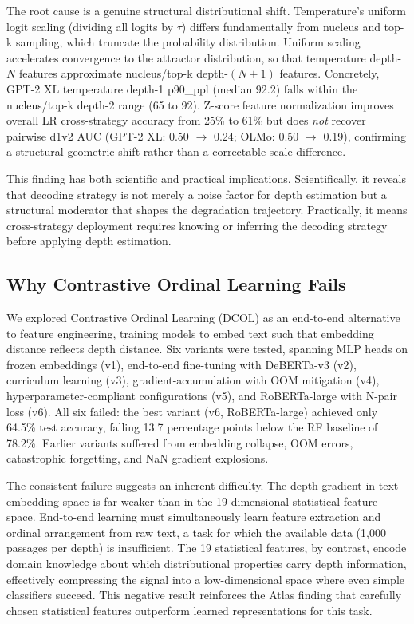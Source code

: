 \documentclass[11pt,a4paper]{article}
\begin{document}
The root cause is a genuine structural distributional shift.
Temperature's uniform logit scaling (dividing all logits by $\tau$) differs fundamentally from nucleus and top-k sampling, which truncate the probability distribution.
Uniform scaling accelerates convergence to the attractor distribution, so that temperature depth-$N$ features approximate nucleus/top-k depth-$(N{+}1)$ features.
Concretely, GPT-2 XL temperature depth-1 p90\_ppl (median 92.2) falls within the nucleus/top-k depth-2 range (65 to 92).
Z-score feature normalization improves overall LR cross-strategy accuracy from 25\% to 61\% but does \emph{not} recover pairwise d1v2 AUC (GPT-2 XL: 0.50 $\to$ 0.24; OLMo: 0.50 $\to$ 0.19), confirming a structural geometric shift rather than a correctable scale difference.

This finding has both scientific and practical implications.
Scientifically, it reveals that decoding strategy is not merely a noise factor for depth estimation but a structural moderator that shapes the degradation trajectory.
Practically, it means cross-strategy deployment requires knowing or inferring the decoding strategy before applying depth estimation.

\subsection{Why Contrastive Ordinal Learning Fails}
\label{sec:dcol}

We explored Contrastive Ordinal Learning (DCOL) as an end-to-end alternative to feature engineering, training models to embed text such that embedding distance reflects depth distance.
Six variants were tested, spanning MLP heads on frozen embeddings (v1), end-to-end fine-tuning with DeBERTa-v3 (v2), curriculum learning (v3), gradient-accumulation with OOM mitigation (v4), hyperparameter-compliant configurations (v5), and RoBERTa-large with N-pair loss (v6).
All six failed: the best variant (v6, RoBERTa-large) achieved only 64.5\% test accuracy, falling 13.7 percentage points below the RF baseline of 78.2\%.
Earlier variants suffered from embedding collapse, OOM errors, catastrophic forgetting, and NaN gradient explosions.

The consistent failure suggests an inherent difficulty.
The depth gradient in text embedding space is far weaker than in the 19-dimensional statistical feature space.
End-to-end learning must simultaneously learn feature extraction and ordinal arrangement from raw text, a task for which the available data (1{,}000 passages per depth) is insufficient.
The 19 statistical features, by contrast, encode domain knowledge about which distributional properties carry depth information, effectively compressing the signal into a low-dimensional space where even simple classifiers succeed.
This negative result reinforces the Atlas finding that carefully chosen statistical features outperform learned representations for this task.
\end{document}
